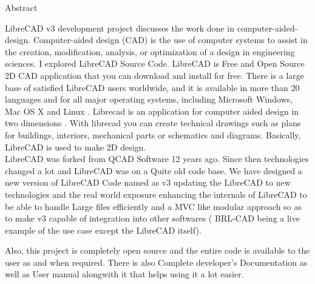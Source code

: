 \begin{Large}
\begin{center}Abstract\end{center}
\end{Large}

\noindent LibreCAD v3 development project discusses the work done in computer-aided-design. Computer-aided design (CAD) is the use of computer systems to assist in the creation, modification, analysis, or optimization of a design in engineering sciences. I explored  LibreCAD  Source  Code. LibreCAD is Free and Open Source  2D  CAD   application  that  you  can  download  and  install  for  free.  There  is  a  large base  of  satisfied  LibreCAD   users  worldwide,  and  it  is  available  in  more  than  20  languages  and  for  all major  operating  systems,  including  Microsoft  Windows,  Mac  OS  X  and  Linux .  Librecad  is  an  application  for  computer  aided  design  in  two dimensions  .  With  librecad   you   can  create  technical  drawings  such  as  plans  for  buildings,  interiors, mechanical parts or schematics and diagrams. Basically, LibreCAD is used to make 2D design. \\

\noindent LibreCAD was forked from QCAD Software 12 years ago. Since then technologies changed a lot and LibreCAD was on a Quite old code base. We have designed a new version of LibreCAD Code named as v3 updating the LibreCAD to new technologies and the real world exposure enhancing the internals of LibreCAD to be able to handle Large files efficiently and a MVC like modular approach so as to make v3 capable of integration into other softwares ( BRL-CAD being a live example of the use case except the LibreCAD itself).

\noindent Also, this project is completely open source and the entire code is available to the user as and when required. There is also Complete developer's Documentation as well as User manual alongwith it that helps using it a lot easier.
